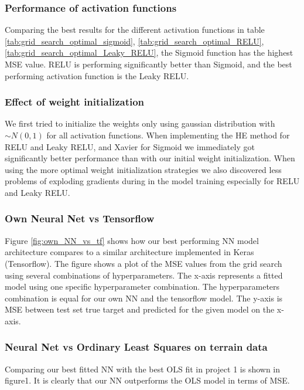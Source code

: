\documentclass
[twocolumn,
secnumarabic,
nobibnotes,
aps,
prl,
reprint,
groupedaddress,
amsmath,
amssymb
]{revtex4-2}
\begin{document}
\subsubsection{Performance of activation functions}
Comparing the best results for the different activation functions in table \ref{tab:grid_search_optimal_sigmoid}, \ref{tab:grid_search_optimal_RELU},\ref{tab:grid_search_optimal_Leaky_RELU}, the Sigmoid function has the highest MSE value. RELU is performing significantly better than Sigmoid, and the best performing activation function is the Leaky RELU.

\subsubsection{Effect of weight initialization}
We first tried to initialize the weights only using gaussian distribution with $\sim N(0,1)$ for all activation functions. When implementing the HE \cite{He2015} method for RELU and Leaky RELU, and Xavier \cite{Glorot2010} for Sigmoid we immediately got significantly better performance than with our initial weight initialization. When using the more optimal weight initialization strategies we also discovered less problems of exploding gradients during in the model training especially for RELU and Leaky RELU.


\subsubsection{Own Neural Net vs Tensorflow}
Figure \ref{fig:own_NN_vs_tf} shows how our best performing NN model architecture compares to a similar architecture implemented in Keras (Tensorflow). The figure shows a plot of the MSE values from the grid search using several combinations of hyperparameters. The x-axis represents a fitted model using one specific hyperparameter combination. The hyperparameters combination is equal for our own NN and the tensorflow model. The y-axis is MSE between test set true target and predicted for the given model on the x-axis.


\subsubsection{Neural Net vs Ordinary Least Squares on terrain data}
Comparing our best fitted NN with the best OLS fit in project 1 is shown in figure1. It is clearly that our NN outperforms the OLS model in terms of MSE.
\end{document}
